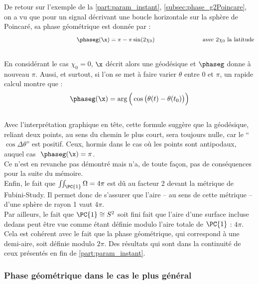 De retour sur l'exemple de la \cref{part:param_instant}, \cref{subsec:phase_g2Poincare}, on a vu que pour un signal décrivant une boucle horizontale sur la sphère de Poincaré, sa phase géométrique est donnée par :
\[\qquad\qquad\qquad\qquad\qquad\qquad \phaseg(\x) = \pi - \pi\sin (2\chi_0) \qquad\qquad\qquad\qquad \text{avec $2\chi_0$ la latitude}\]
\\ 
En considérant le cas $\chi_0=0$, $\x$ décrit alors une géodésique et $\phaseg$ donne à nouveau $\pi$. Aussi, et surtout, si l'on se met à faire varier $\theta$ entre $0$ et $\pi$, un rapide calcul montre que :
\[\phaseg(\x) = \arg\Big(\cos\big( \theta(t) - \theta(t_0) \big)\Big)\]
\\
Avec l’interprétation graphique en tête, cette formule suggère que la géodésique, reliant deux points, au sens du chemin le plus court, sera toujours nulle, car le ``$\cos\Delta\theta$'' est positif. Ceux, hormis dans le cas où les points sont antipodaux, auquel cas $\ \phaseg(\x)=\pi$.
\\
Ce n'est en revanche pas démontré mais n'a, de toute façon, pas de conséquences pour la suite du mémoire.\\

Enfin, le fait que $\iint_{\PC{1}}\Omega = 4\pi$ est dû au facteur 2 devant la métrique de Fubini-Study.
Il permet donc de s'assurer que l'aire -- au sens de cette métrique -- d'une sphère de rayon 1 vaut $4\pi$. 
\\
Par ailleurs, le fait que $\PC{1}\cong S^2$ soit fini fait que l'aire d'une surface incluse dedans peut être vue comme étant définie modulo l'aire totale de $\PC{1}$ : $4\pi$.
Cela est cohérent avec le fait que la phase géométrique, qui correspond à une demi-aire, soit définie modulo $2\pi$. Des résultats qui sont dans la continuité de ceux présentés en fin de \cref{part:param_instant}.
\\

\subsubsection{Phase géométrique dans le cas le plus général}

